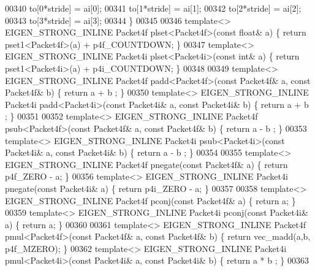 \begin{DoxyCode}
{00340   to[0*stride] = ai[0];
00341   to[1*stride] = ai[1];
00342   to[2*stride] = ai[2];
00343   to[3*stride] = ai[3];
00344 \}
00345 
00346 \textcolor{keyword}{template}<> EIGEN\_STRONG\_INLINE Packet4f plset<Packet4f>(\textcolor{keyword}{const} \textcolor{keywordtype}{float}& a) \{ \textcolor{keywordflow}{return} pset1<Packet4f>(a) + 
      p4f\_COUNTDOWN; \}
00347 \textcolor{keyword}{template}<> EIGEN\_STRONG\_INLINE Packet4i plset<Packet4i>(\textcolor{keyword}{const} \textcolor{keywordtype}{int}& a)   \{ \textcolor{keywordflow}{return} pset1<Packet4i>(a) + 
      p4i\_COUNTDOWN; \}
00348 
00349 \textcolor{keyword}{template}<> EIGEN\_STRONG\_INLINE Packet4f padd<Packet4f>(\textcolor{keyword}{const} Packet4f& a, \textcolor{keyword}{const} Packet4f& b) \{ \textcolor{keywordflow}{return} a + b
      ; \}
00350 \textcolor{keyword}{template}<> EIGEN\_STRONG\_INLINE Packet4i padd<Packet4i>(\textcolor{keyword}{const} Packet4i& a, \textcolor{keyword}{const} Packet4i& b) \{ \textcolor{keywordflow}{return} a + b
      ; \}
00351 
00352 \textcolor{keyword}{template}<> EIGEN\_STRONG\_INLINE Packet4f psub<Packet4f>(\textcolor{keyword}{const} Packet4f& a, \textcolor{keyword}{const} Packet4f& b) \{ \textcolor{keywordflow}{return} a - b
      ; \}
00353 \textcolor{keyword}{template}<> EIGEN\_STRONG\_INLINE Packet4i psub<Packet4i>(\textcolor{keyword}{const} Packet4i& a, \textcolor{keyword}{const} Packet4i& b) \{ \textcolor{keywordflow}{return} a - b
      ; \}
00354 
00355 \textcolor{keyword}{template}<> EIGEN\_STRONG\_INLINE Packet4f pnegate(\textcolor{keyword}{const} Packet4f& a) \{ \textcolor{keywordflow}{return} p4f\_ZERO - a; \}
00356 \textcolor{keyword}{template}<> EIGEN\_STRONG\_INLINE Packet4i pnegate(\textcolor{keyword}{const} Packet4i& a) \{ \textcolor{keywordflow}{return} p4i\_ZERO - a; \}
00357 
00358 \textcolor{keyword}{template}<> EIGEN\_STRONG\_INLINE Packet4f pconj(\textcolor{keyword}{const} Packet4f& a) \{ \textcolor{keywordflow}{return} a; \}
00359 \textcolor{keyword}{template}<> EIGEN\_STRONG\_INLINE Packet4i pconj(\textcolor{keyword}{const} Packet4i& a) \{ \textcolor{keywordflow}{return} a; \}
00360 
00361 \textcolor{keyword}{template}<> EIGEN\_STRONG\_INLINE Packet4f pmul<Packet4f>(\textcolor{keyword}{const} Packet4f& a, \textcolor{keyword}{const} Packet4f& b) \{ \textcolor{keywordflow}{return} 
      vec\_madd(a,b, p4f\_MZERO); \}
00362 \textcolor{keyword}{template}<> EIGEN\_STRONG\_INLINE Packet4i pmul<Packet4i>(\textcolor{keyword}{const} Packet4i& a, \textcolor{keyword}{const} Packet4i& b) \{ \textcolor{keywordflow}{return} a * b
      ; \}
00363 
}
\end{DoxyCode}
